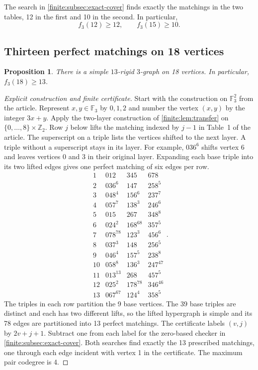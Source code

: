 \documentclass[10pt]{article}
\numberwithin{equation}{section}
\newtheorem{proposition}[proposition]{Proposition}\aliascntresetthe{proposition}
\begin{document}
The search in \cref{finite:subsec:exact-cover} finds exactly the matchings in the two tables, 12 in the first and 10 in the second. In particular,
\[
 f_3(12)\ge12,\qquad f_3(15)\ge10.
\]

\subsection{Thirteen perfect matchings on 18 vertices}
\begin{proposition}\label{finite:prop:thirteen18}
There is a simple $13$-rigid $3$-graph on 18 vertices.
In particular, $f_3(18)\ge13$.
\end{proposition}
\begin{proof}[Explicit construction and finite certificate]
Start with the construction on $\mathbb F_3^2$ from the article. Represent $x,y\in\mathbb F_3$ by $0,1,2$ and number the vertex $(x,y)$ by the integer $3x+y$. Apply the two-layer construction of \cref{finite:lem:transfer} on $\{0,\ldots,8\}\times\mathbb Z_2$. Row $j$ below lifts the matching indexed by $j-1$ in Table~1 of the article. The superscript on a triple lists the vertices shifted to the next layer. A triple without a superscript stays in its layer. For example, $036^{6}$ shifts vertex 6 and leaves vertices 0 and 3 in their original layer. Expanding each base triple into its two lifted edges gives one perfect matching of six edges per row.
\[
\begin{array}{c|ccc}
1&012&345&678\\
2&036^{6}&147&258^{5}\\
3&048^{4}&156^{6}&237^{7}\\
4&057^{7}&138^{3}&246^{6}\\
5&015&267&348^{8}\\
6&024^{2}&168^{68}&357^{5}\\
7&078^{78}&123^{3}&456^{6}\\
8&037^{3}&148&256^{5}\\
9&046^{4}&157^{5}&238^{8}\\
10&058^{8}&136^{3}&247^{47}\\
11&013^{13}&268&457^{5}\\
12&025^{2}&178^{78}&346^{46}\\
13&067^{67}&124^{4}&358^{5}
\end{array}.
\]
The triples in each row partition the 9 base vertices. The 39 base triples are distinct and each has two different lifts, so the lifted hypergraph is simple and its 78 edges are partitioned into 13 perfect matchings. The certificate labels $(v,j)$ by $2v+j+1$. Subtract one from each label for the zero-based checker in \cref{finite:subsec:exact-cover}. Both searches find exactly the 13 prescribed matchings, one through each edge incident with vertex 1 in the certificate. The maximum pair codegree is 4.
\end{proof}
\end{document}
